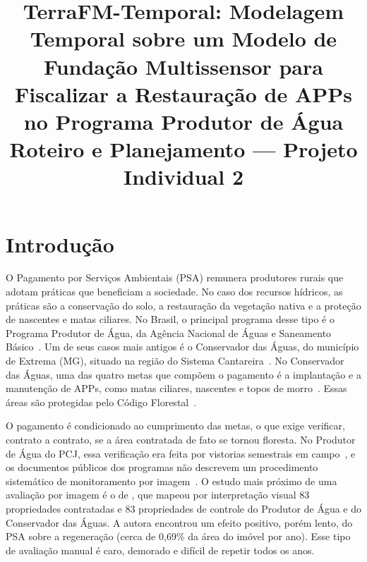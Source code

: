 \documentclass[conference]{IEEEtran}
\begin{document}
\title{TerraFM-Temporal: Modelagem Temporal sobre um Modelo de Fundação Multissensor para Fiscalizar a Restauração de APPs no Programa Produtor de Água\\[4pt]
\large Roteiro e Planejamento --- Projeto Individual 2}

\author{
}

\maketitle

\section{Introdução}\label{sec:introducao}

O Pagamento por Serviços Ambientais (PSA) remunera produtores rurais que adotam práticas que beneficiam a sociedade. No caso dos recursos hídricos, as práticas são a conservação do solo, a restauração da vegetação nativa e a proteção de nascentes e matas ciliares. No Brasil, o principal programa desse tipo é o Programa Produtor de Água, da Agência Nacional de Águas e Saneamento Básico~\citep{ana2018}. Um de seus casos mais antigos é o Conservador das Águas, do município de Extrema (MG), situado na região do Sistema Cantareira~\citep{pcj_conservador,ruggiero2019}. No Conservador das Águas, uma das quatro metas que compõem o pagamento é a implantação e a manutenção de APPs, como matas ciliares, nascentes e topos de morro~\citep{pcj_conservador}. Essas áreas são protegidas pelo Código Florestal~\citep{brasil2012}.

O pagamento é condicionado ao cumprimento das metas, o que exige verificar, contrato a contrato, se a área contratada de fato se tornou floresta. No Produtor de Água do PCJ, essa verificação era feita por vistorias semestrais em campo~\citep{viani2019}, e os documentos públicos dos programas não descrevem um procedimento sistemático de monitoramento por imagem~\citep{ana2018,pcj_conservador}. O estudo mais próximo de uma avaliação por imagem é o de \citet{ruggiero2019}, que mapeou por interpretação visual 83 propriedades contratadas e 83 propriedades de controle do Produtor de Água e do Conservador das Águas. A autora encontrou um efeito positivo, porém lento, do PSA sobre a regeneração (cerca de 0,69\% da área do imóvel por ano). Esse tipo de avaliação manual é caro, demorado e difícil de repetir todos os anos.
\end{document}
